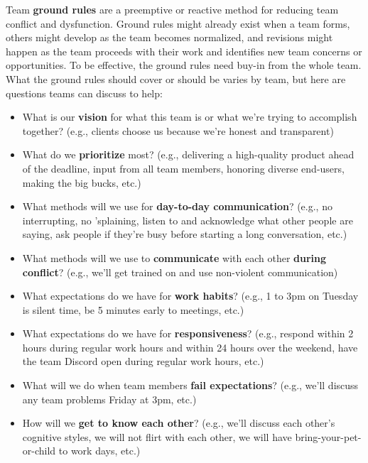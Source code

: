 \marginpar{\groundRulesDef\margindivider}
Team \textbf{ground rules} are a preemptive or reactive method for reducing team conflict and dysfunction. Ground rules might already exist when a team forms, others might develop as the team becomes normalized, and revisions might happen as the team proceeds with their work and identifies new team concerns or opportunities. To be effective, the ground rules need buy-in from the whole team. What the ground rules should cover or should be varies by team, but here are questions teams can discuss to help:
\begin{itemize}
    \item What is our \textbf{vision} for what this team is or what we're trying to accomplish together? (e.g., clients choose us because we're honest and transparent)
    \item What do we \textbf{prioritize} most? (e.g., delivering a high-quality product ahead of the deadline, input from all team members, honoring diverse end-users, making the big bucks, etc.)
    \item What methods will we use for \textbf{day-to-day communication}? (e.g., no interrupting, no 'splaining, listen to and acknowledge what other people are saying, ask people if they're busy before starting a long conversation, etc.)
    \item What methods will we use to \textbf{communicate} with each other \textbf{during} \textbf{conflict}? (e.g., we'll get trained on and use non-violent communication)
    \item What expectations do we have for \textbf{work habits}? (e.g., 1 to 3pm on Tuesday is silent time, be 5 minutes early to meetings, etc.)
    \item What expectations do we have for \textbf{responsiveness}? (e.g., respond within 2 hours during regular work hours and within 24 hours over the weekend, have the team Discord open during regular work hours, etc.)
    \item What will we do when team members \textbf{fail expectations}? (e.g., we'll discuss any team problems Friday at 3pm, etc.)
    \item How will we \textbf{get to know each other}? (e.g., we'll discuss each other's cognitive styles, we will not flirt with each other, we will have bring-your-pet-or-child to work days, etc.)
\end{itemize}

